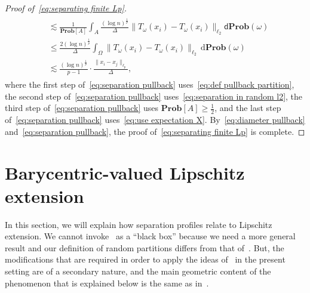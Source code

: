 \documentclass[11pt,reqno]{amsart}
\renewcommand{\le}{\leqslant}
\renewcommand{\ge}{\geqslant}
\newcommand{\ud}[0]{\,\mathrm{d}}
\newcommand{\dd}{\mathsf{d}}
\theoremstyle{remark}
\renewcommand{\Pr}{\mathbf{Prob}}
\renewcommand{\1}{\mathbf 1}
\begin{document}
\begin{proof}[Proof of~\eqref{eq:separating finite Lp}]
\begin{align}
\begin{split}
&\lesssim \frac{1}{\Pr[A]} \int_A \frac{(\log n)^{\frac{1}{p}}}{\Delta}\big\|T_\omega(x_i)- T_\omega(x_i)\big\|_{{\ell}_2} \dd\Pr(\omega)\\
&\le \frac{2(\log n)^{\frac{1}{p}}}{\Delta} \int_\Omega \big\|T_\omega(x_i)- T_\omega(x_i)\big\|_{{\ell}_2}\ud\Pr(\omega)\\
&\lesssim  \frac{(\log n)^{\frac{1}{p}}}{p-1}\cdot \frac{\|x_i-x_j\|_{{\ell}_p}}{\Delta},
\end{split}
\end{align}
where the first step of~\eqref{eq:separation pullback} uses~\eqref{eq:def pullback partition},  the second step of~\eqref{eq:separation pullback} uses~\eqref{eq:separation in random l2}, the third step of~\eqref{eq:separation pullback} uses  $\Pr[A]\ge \frac12$, and the last step of~\eqref{eq:separation pullback} uses~\eqref{eq:use expectation X}. By~\eqref{eq:diameter pullback} and~\eqref{eq:separation pullback}, the proof of~\eqref{eq:separating finite Lp} is complete.
\end{proof}


\section{Barycentric-valued Lipschitz extension}\label{sec:ext}


In this section, we will explain how separation profiles relate to Lipschitz extension. We cannot invoke~\cite{LN05} as a ``black box'' because we need a more general result and our  definition of random partitions differs from that of~\cite{LN05}. But, the modifications that are required in order to apply the ideas of~\cite{LN05} in the present setting are of a secondary nature, and the main geometric content of the phenomenon that is explained below is the same as in~\cite{LN05}.
\end{document}
